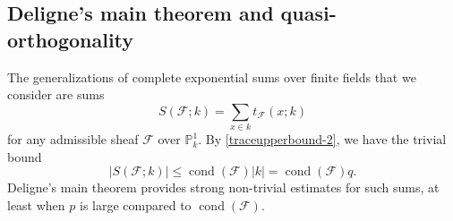 \documentclass[12pt,a4paper,reqno]{amsart}
\numberwithin{equation}{section}
\DeclareMathOperator*\cond{cond}
\DeclareMathOperator*\Gal{Gal}
\theoremstyle{plain}
\theoremstyle{definition}
\newcommand\F{\mathbb{F}}
\newcommand\ov{\overline}
\newcommand\mcF{\mathcal{F}}
\newcommand\mcG{\mathcal{G}}
\newcommand\Pl{\mathbb{P}^1}
\newcommand\Fp{\F_{p}}
\newcommand{\alert}[1]{{\bf \color{red} TODO: #1}}
\begin{document}


\subsection{Deligne's main theorem and quasi-orthogonality}

The generalizations of complete exponential sums over finite fields
that we consider are sums
$$
S(\mcF;k)=\sum_{x\in k}t_\mcF(x;k)
$$
for any admissible sheaf $\mcF$ over $\Pl_k$. By
\eqref{traceupperbound-2}, we have the trivial bound
$$
|S(\mcF;k)|\leq \cond(\mcF)|k|=\cond(\mcF)q.
$$
Deligne's main theorem \cite[Thm.~1]{WeilII} provides strong
non-trivial estimates for such sums, at least when $p$ is large
compared to $\cond(\mcF)$.
\end{document}
